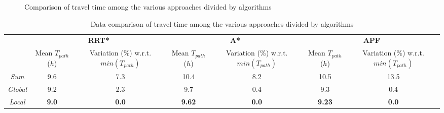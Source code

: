   
\newpage
\begin{figure}[H]
	\centering 
	\hspace{0.2cm}
	\hspace{0.2cm}
	\captionsetup{font=footnotesize,labelfont=footnotesize}
	\caption{Comparison of travel time among the various approaches divided by algorithms} 
	\label{compalg}
\end{figure}

\begin{table}[htbp]
	\small
	\centering
	
	\begin{tabular}{|c|c|c|c|c|c|c|}
		\hline
		\multirow{3}{*}{}  & \multicolumn{2}{c|}{\textbf{RRT*}} & \multicolumn{2}{c|}{\textbf{A*}} & \multicolumn{2}{c|}{\textbf{APF}} \bigstrut\\
		\cline{2-7}
		& \multirow{2}{*}{\parbox{3em}{\centering \small Mean $T_{path}$($h$)}} & \multirow{2}{*}{\parbox{4em}{\centering \scriptsize Variation (\%) w.r.t. $min(T_{path})$}} & \multirow{2}{*}{\parbox{3em}{\centering \small Mean $T_{path}$($h$)}} & \multirow{2}{*}{\parbox{4em}{\centering \scriptsize Variation (\%) w.r.t. $min(T_{path})$}} & \multirow{2}{*}{\parbox{3em}{\centering \small Mean $T_{path}$($h$)}} & \multirow{2}{*}{\parbox{4em}{\centering \scriptsize Variation (\%) w.r.t. $min(T_{path})$}} \bigstrut[t]\\
		&   &   &   &   & & \bigstrut[b]\\
		\hline
		\small \textit{Sum} & 9.6  & 7.3   & 10.4   & 8.2  & 10.5   & 13.5 \bigstrut\\
		\hline
		\small \textit{Global} & 9.2  & 2.3   & 9.7   & 0.4   & 9.3   & 0.4 \bigstrut\\
		\hline
		\small \textit{Local} & \textbf{9.0}  & \textbf{0.0}   & \textbf{9.62}   & \textbf{0.0}   & \textbf{9.23}   & \textbf{0.0} \bigstrut\\
		\hline
	\end{tabular}%
	\captionsetup{font=footnotesize,labelfont=footnotesize}
	\caption{Data comparison of travel time among the various approaches divided by algorithms}
	\label{tablecompalg}%
\end{table}%

